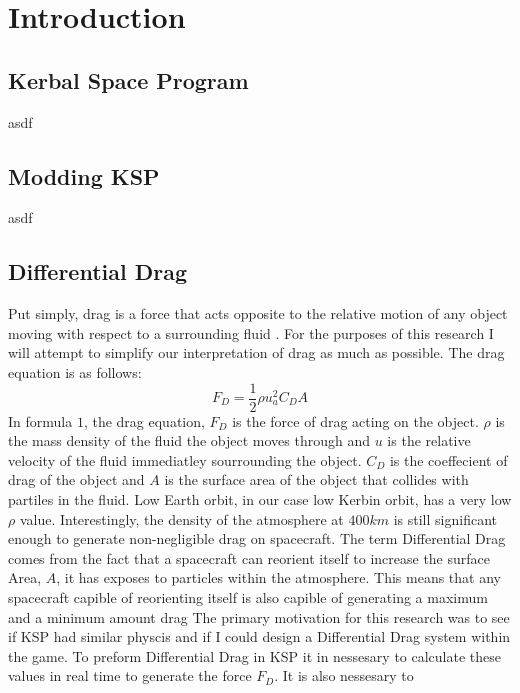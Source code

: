 \documentclass[journal,a4paper]{IEEEtran}
\begin{document}
\IEEEpeerreviewmaketitle


%
%
\section{Introduction}

\subsection{Kerbal Space Program}
asdf

\subsection{Modding KSP}
asdf

\subsection{Differential Drag}
Put simply, drag is a force that acts opposite to the relative motion of any object
moving with respect to a surrounding fluid \cite{drag_deff}. For the purposes of this
research I will attempt to simplify our interpretation of drag as much as possible.
The drag equation is as follows:
\begin{equation}
F_D = \frac{1}{2} \rho u_a^2 C_D A
\end{equation}
In formula $1$, the drag equation, $F_D$ is the force of drag acting on the object.
$\rho$ is the mass density of the fluid the object moves through and $u$ is the relative
velocity of the fluid immediatley sourrounding the object. $C_D$ is the coeffecient of
drag of the object and $A$ is the surface area of the object that collides with
partiles in the fluid. Low Earth orbit, in our case low Kerbin orbit, has a very low $\rho$ value. Interestingly,
the density of the atmosphere at $400km$ is still significant enough to
generate non-negligible drag on spacecraft. The term Differential Drag
comes from the fact that a spacecraft can reorient itself to increase the surface
Area, $A$, it has exposes to particles within the atmosphere. This means that any
spacecraft capible of reorienting itself is also capible of generating a maximum
and a minimum amount drag
The primary motivation for this research was to see if KSP had similar physcis and
if I could design a Differential Drag system within the game. To preform Differential
Drag in KSP it in nessesary to calculate
these values in real time to generate the force $F_D$. It is also nessesary to
\end{document}

